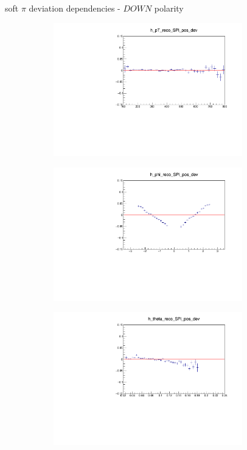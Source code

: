 \documentclass[11pt]{beamer}
\begin{document}
\begin{frame}{soft $\pi$ deviation dependencies - $DOWN$ polarity}
\begin{figure}
\begin{subfigure}{0.45\textwidth}
\includegraphics[width=0.9\textwidth]{first/down_pdf/deviation/h_pt_reco_SPi_pos_dev.pdf}
\end{subfigure}
\begin{subfigure}{0.45\textwidth}
\includegraphics[width=0.9\textwidth]{first/down_pdf/deviation/h_phi_reco_SPi_pos_dev.pdf}
\end{subfigure}
\begin{subfigure}{0.45\textwidth}
\includegraphics[width=0.9\textwidth]{first/down_pdf/deviation/h_theta_reco_SPi_pos_dev.pdf}

\end{subfigure}
\end{figure}
\end{frame}
\end{document}

